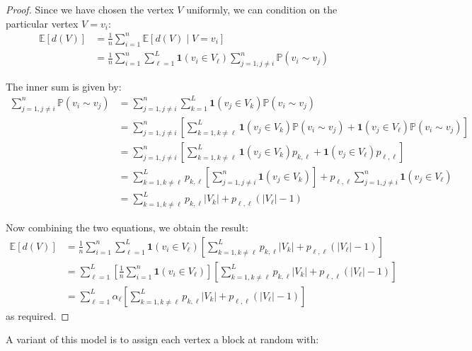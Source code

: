 \documentclass{article}
\begin{document}
\begin{proof}
    Since we have chosen the vertex $V$ uniformly, we can condition on the particular vertex $V=v_i$:
    \begin{align*}
        \mathbb{E}[d(V)] &= \frac{1}{n} \sum_{i=1}^n \mathbb{E}[d(V)\mid V=v_i]\\
        &= \frac{1}{n} \sum_{i=1}^n \sum_{\ell=1}^L \mathbf{1}(v_i \in V_{\ell}) \sum_{j=1, j\neq i}^n \mathbb{P}(v_i \sim v_j)
    \end{align*}

    The inner sum is given by:
    \begin{align*}
        \sum_{j=1, j\neq i}^n \mathbb{P}(v_i \sim v_j) &= \sum_{j=1, j\neq i}^n \sum_{k=1}^L \mathbf{1}(v_j \in V_k) \mathbb{P}(v_i \sim v_j)\\
        &= \sum_{j=1, j\neq i}^n \left[\sum_{k=1, k\neq \ell}^L \mathbf{1}(v_j \in V_k) \mathbb{P}(v_i \sim v_j) + \mathbf{1}(v_j \in V_\ell) \mathbb{P}(v_i \sim v_j)\right]\\
        &= \sum_{j=1, j\neq i}^n \left[\sum_{k=1, k\neq \ell}^L \mathbf{1}(v_j \in V_k) p_{k,\ell} + \mathbf{1}(v_j \in V_\ell) p_{\ell, \ell}\right]\\
        &= \sum_{k=1, k\neq \ell}^L p_{k,\ell} \left[\sum_{j=1, j\neq i}^n \mathbf{1}(v_j \in V_k)\right]  +p_{\ell, \ell} \sum_{j=1, j\neq i}^n \mathbf{1}(v_j \in V_\ell) \\
        &= \sum_{k=1, k\neq \ell}^L p_{k,\ell} |V_k| + p_{\ell, \ell} (|V_\ell|-1)
    \end{align*}

    Now combining the two equations, we obtain the result:
    \begin{align*}
        \mathbb{E}[d(V)] &= \frac{1}{n} \sum_{i=1}^n \sum_{\ell=1}^L \mathbf{1}(v_i \in V_{\ell}) \left[\sum_{k=1, k\neq \ell}^L p_{k,\ell} |V_k| + p_{\ell, \ell} (|V_\ell|-1)\right]\\
        &= \sum_{\ell=1}^L \left[\frac{1}{n} \sum_{i=1}^{n} \mathbf{1}(v_i \in V_{\ell})\right] \left[\sum_{k=1, k\neq \ell}^L p_{k,\ell} |V_k| + p_{\ell, \ell} (|V_\ell|-1)\right]\\
        &= \sum_{\ell=1}^{L} \alpha_\ell \left[\sum_{k=1, k\neq \ell}^L p_{k,\ell} |V_k| + p_{\ell, \ell} (|V_\ell|-1)\right]
    \end{align*}
    as required.  
\end{proof}


A variant of this model is to assign each vertex a block at random with:  
\end{document}
